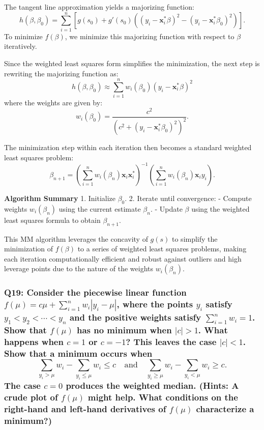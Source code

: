 \documentclass[8pt]{article}
\begin{document}
{The tangent line approximation yields a majorizing function:
\[ h(\beta, \beta_0) = \sum_{i=1}^{n} \left[ g(s_0) + g'(s_0) \left((y_i - \mathbf{x}_i^* \beta)^2 - (y_i - \mathbf{x}_i^* \beta_0)^2\right) \right]. \]
To minimize \(f(\beta)\), we minimize this majorizing function with respect to \(\beta\) iteratively.

Since the weighted least squares form simplifies the minimization, the next step is rewriting the majorizing function as:
\[ h(\beta, \beta_0) \approx \sum_{i=1}^{n} w_i (\beta_0) (y_i - \mathbf{x}_i^* \beta)^2 \]
where the weights are given by:
\[ w_i(\beta_0) = \frac{c^2}{(c^2 + (y_i - \mathbf{x}_i^* \beta_0)^2)^2}. \]

The minimization step within each iteration then becomes a standard weighted least squares problem:
\[ \beta_{n+1} = \left(\sum_{i=1}^{n} w_i(\beta_n) \mathbf{x}_i \mathbf{x}_i^*\right)^{-1} \left(\sum_{i=1}^{n} w_i(\beta_n) \mathbf{x}_i y_i\right). \]

\textbf{Algorithm Summary}
1. Initialize \(\beta_0\).
2. Iterate until convergence:
   - Compute weights \( w_i(\beta_n) \) using the current estimate \(\beta_n\).
   - Update \(\beta\) using the weighted least squares formula to obtain \(\beta_{n+1}\).

This MM algorithm leverages the concavity of \(g(s)\) to simplify the minimization of \(f(\beta)\) to a series of weighted least squares problems, making each iteration computationally efficient and robust against outliers and high leverage points due to the nature of the weights \(w_i(\beta_n)\).

\subsubsection*{Q19: Consider the piecewise linear function \( f(\mu) = c\mu + \sum_{i=1}^{n} w_i |y_i - \mu| \), where the points \( y_i \) satisfy \( y_1 < y_2 < \cdots < y_n \) and the positive weights satisfy \( \sum_{i=1}^{n} w_i = 1 \). Show that \( f(\mu) \) has no minimum when \( |c| > 1 \). What happens when \( c = 1 \) or \( c = -1 \)? This leaves the case \( |c| < 1 \). Show that a minimum occurs when
\[
\sum_{y_i > \mu} w_i - \sum_{y_i \leq \mu} w_i \leq c \quad \text{and} \quad \sum_{y_i \geq \mu} w_i - \sum_{y_i < \mu} w_i \geq c.
\]
The case \( c = 0 \) produces the weighted median. (Hints: A crude plot of \( f(\mu) \) might help. What conditions on the right-hand and left-hand derivatives of \( f(\mu) \) characterize a minimum?)}

}
\end{document}
